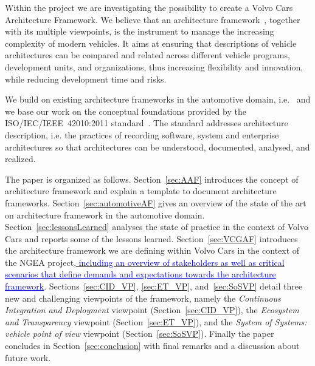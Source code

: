 \documentclass[preprint,12pt,3p]{elsarticle}
\newcommand{\ins}[1]{\textcolor{blue}{\uline{#1}}} %
\newcommand\eric[1]{\nb{Eric}{#1}}
\begin{document}
Within the project we are investigating the possibility to create a Volvo Cars Architecture Framework. %
We believe that an architecture framework~\cite{42010}, together with its multiple viewpoints, is the instrument to manage the increasing complexity of modern vehicles.
It aims at ensuring that descriptions of vehicle architectures can be compared and related across different vehicle programs,
development units, and organizations, thus increasing flexibility and innovation, while reducing development time and risks.

We build on existing architecture frameworks in the automotive domain, i.e.~\cite{Broy,Yania} and we base our work on the conceptual foundations provided by the ISO/IEC/IEEE~42010:2011 standard~\cite{42010}.   
The standard 
 addresses architecture description, i.e. the practices of recording software, system
and enterprise architectures so that architectures can be understood,
documented, analysed, and realized. 

The paper is organized as follows. Section~\ref{sec:AAF} introduces the concept of architecture framework and explain a template to document architecture frameworks. Section~\ref{sec:automotiveAF} gives an overview of 
 the state of the art on architecture framework in the automotive domain. Section~\ref{sec:lessonsLearned} analyses the state of practice in the context of Volvo Cars and reports some of the lessons learned. 
 Section~\ref{sec:VCGAF} introduces the architecture framework we are defining within Volvo Cars in the context of the NGEA project\ins{, including an overview of stakeholders as well as critical scenarios that define demands and expectations towards the architecture framework}. %
 Sections~\ref{sec:CID_VP}, \ref{sec:ET_VP}, and~\ref{sec:SoSVP} detail three new and challenging viewpoints of the framework, namely the {\em Continuous Integration and Deployment} viewpoint (Section~\ref{sec:CID_VP}), the {\em Ecosystem and Transparency} viewpoint (Section~\ref{sec:ET_VP}), and the {\em System of Systems: vehicle point of view} viewpoint (Section~\ref{sec:SoSVP}).
Finally the paper concludes in Section~\ref{sec:conclusion} with final remarks and a discussion about future work. 
\end{document}
